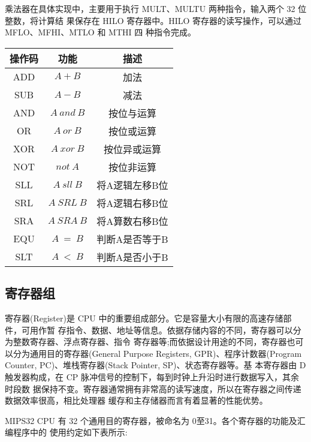\documentclass[11pt,utf8]{article}
\begin{document}
乘法器在具体实现中，主要用于执行 MULT、MULTU 两种指令，输入两个 32 位整数，将计算结 果保存在 HILO 寄存器中。HILO 寄存器的读写操作，可以通过 MFLO、MFHI、MTLO 和 MTHI 四 种指令完成。
\begin{center}
\begin{tabular}{|c|c|c|}
\hline
\textbf{操作码} & \textbf{功能} & \textbf{描述} \\
\hline
ADD & $A+B$ & 加法 \\
SUB & $A-B$ & 减法 \\
AND & $A~and~B$ & 按位与运算 \\
OR & $A~or~B$ & 按位或运算 \\
XOR & $A~xor~B$ & 按位异或运算 \\
NOT & $not~A$ & 按位非运算 \\
SLL & $A~sll~B$ & 将A逻辑左移B位 \\
SRL & $A~SRL~B$ & 将A逻辑右移B位 \\
SRA & $A~SRA~B$ & 将A算数右移B位 \\
EQU & $A~=~B$ & 判断A是否等于B \\
SLT & $A~<~B$ & 判断A是否小于B \\
\hline
\end{tabular}
\end{center}
\subsection{寄存器组}
寄存器(Register)是 CPU 中的重要组成部分。它是容量大小有限的高速存储部件，可用作暂 存指令、数据、地址等信息。依据存储内容的不同，寄存器可以分为整数寄存器、浮点寄存器、指令 寄存器等;而依据设计用途的不同，寄存器也可以分为通用目的寄存器(General Purpose Registers, GPR)、程序计数器(Program Counter, PC)、堆栈寄存器(Stack Pointer, SP)、状态寄存器等。基 本寄存器由 D 触发器构成，在 CP 脉冲信号的控制下，每到时钟上升沿时进行数据写入，其余时段数 据保持不变。寄存器通常拥有非常高的读写速度，所以在寄存器之间传递数据效率很高，相比处理器 缓存和主存储器而言有着显著的性能优势。

MIPS32 CPU 有 32 个通用目的寄存器，被命名为 $0 至 $31。各个寄存器的功能及汇编程序中的 使用约定如下表所示:
\end{document}

